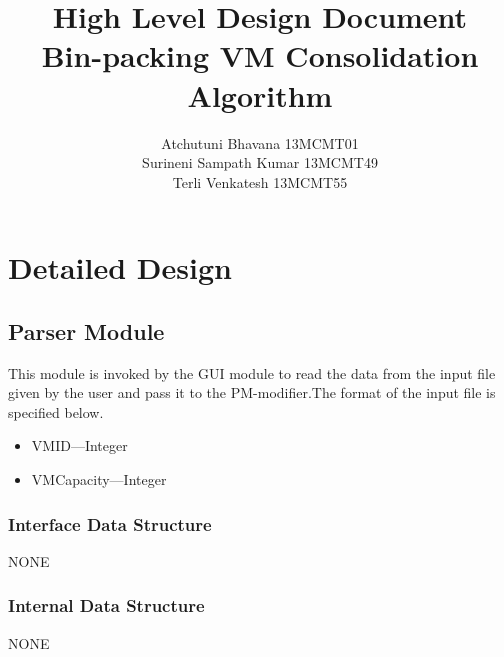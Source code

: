 \documentclass[a4paper,11pt]{article}
\title{High Level Design Document \\ Bin-packing VM Consolidation Algorithm}
\author{Atchutuni Bhavana 13MCMT01 \\ Surineni Sampath Kumar 13MCMT49 \\ Terli Venkatesh 13MCMT55}
\date{}
\begin{document}
\maketitle
\pagebreak
\tableofcontents
\pagebreak

\section{Detailed Design}

\subsection{Parser Module}
This module is invoked by the GUI module to read the data from the input file given by the user and pass it to the PM-modifier.The format of the input file is specified below.\\
\begin{itemize}
\item VM\textunderscore ID---Integer
\item VM\textunderscore Capacity---Integer
\end{itemize}
\subsubsection{Interface Data Structure}
\hspace*{1.1cm}NONE
\subsubsection{Internal Data Structure}
\hspace*{1.1cm}NONE
\end{document}
